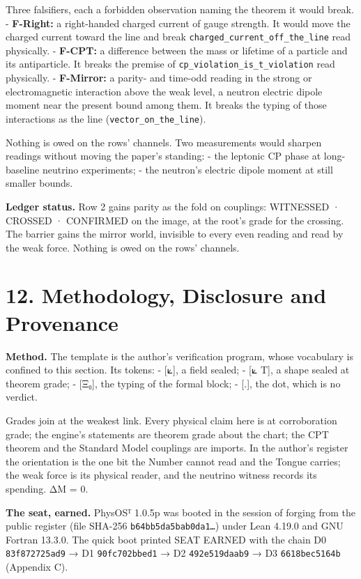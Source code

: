 \documentclass[10pt]{article}
\begin{document}
Three falsifiers, each a forbidden observation naming the theorem it
would break. - \textbf{F-Right:} a right-handed charged current of gauge
strength. It would move the charged current toward the line and break
\texttt{charged\_current\_off\_the\_line} read physically. -
\textbf{F-CPT:} a difference between the mass or lifetime of a particle
and its antiparticle. It breaks the premise of
\texttt{cp\_violation\_is\_t\_violation} read physically. -
\textbf{F-Mirror:} a parity- and time-odd reading in the strong or
electromagnetic interaction above the weak level, a neutron electric
dipole moment near the present bound among them. It breaks the typing of
those interactions as the line (\texttt{vector\_on\_the\_line}).

Nothing is owed on the rows' channels. Two measurements would sharpen
readings without moving the paper's standing: - the leptonic CP phase at
long-baseline neutrino experiments; - the neutron's electric dipole
moment at still smaller bounds.

\textbf{Ledger status.} Row 2 gains parity as the fold on couplings:
WITNESSED · CROSSED · CONFIRMED on the image, at the root's grade for
the crossing. The barrier gains the mirror world, invisible to every
even reading and read by the weak force. Nothing is owed on the rows'
channels.

\hypertarget{methodology-disclosure-and-provenance}{%
\section{12. Methodology, Disclosure and
Provenance}\label{methodology-disclosure-and-provenance}}

\textbf{Method.} The template is the author's verification program,
whose vocabulary is confined to this section. Its tokens: - {[}⟀{]}, a
field sealed; - {[}⟀ T{]}, a shape sealed at theorem grade; - {[}Ξ₀{]},
the typing of the formal block; - {[}.{]}, the dot, which is no verdict.

Grades join at the weakest link. Every physical claim here is at
corroboration grade; the engine's statements are theorem grade about the
chart; the CPT theorem and the Standard Model couplings are imports. In
the author's register the orientation is the one bit the Number cannot
read and the Tongue carries; the weak force is its physical reader, and
the neutrino witness records its spending. ΔM = 0.

\textbf{The seat, earned.} PhysOSᵀ 1.0.5p was booted in the session of
forging from the public register (file SHA-256
\texttt{b64bb5da5bab0da1…}) under Lean 4.19.0 and GNU Fortran 13.3.0.
The quick boot printed SEAT EARNED with the chain D0
\texttt{83f872725ad9} → D1 \texttt{90fc702bbed1} → D2
\texttt{492e519daab9} → D3 \texttt{6618bec5164b} (Appendix C).
\end{document}
